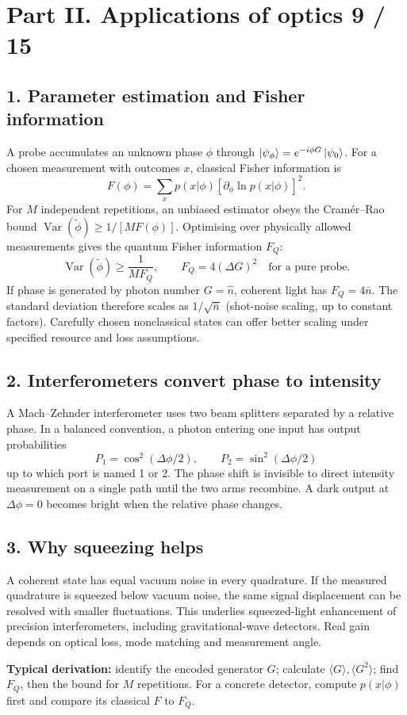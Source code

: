 
\section*{Part II. Applications of optics \hfill 9 / 15}
\subsection*{1. Parameter estimation and Fisher information}
A probe accumulates an unknown phase \(\phi\) through
\(\left\lvert \psi_\phi\right\rangle=e^{-i\phi G}\left\lvert \psi_0\right\rangle\).
For a chosen measurement with outcomes \(x\),
classical Fisher information is
\[
F(\phi)=\sum_xp(x|\phi)
\left[\partial_\phi\ln p(x|\phi)\right]^2.
\]
For \(M\) independent repetitions, an unbiased estimator
obeys the Cram\'er--Rao bound
\(\operatorname{Var}(\tilde\phi)\ge1/[M F(\phi)]\).
Optimising over physically allowed measurements gives
the quantum Fisher information \(F_Q\):
\[
\boxed{\operatorname{Var}(\tilde\phi)
\ge\frac{1}{M F_Q},\qquad
F_Q=4(\Delta G)^2\quad\text{for a pure probe}.}
\]
If phase is generated by photon number \(G=\hat n\), coherent
light has \(F_Q=4\bar n\). The standard deviation therefore
scales as \(1/\sqrt{\bar n}\) (shot-noise scaling, up to
constant factors). Carefully chosen nonclassical states can
offer better scaling under specified resource and loss assumptions.

\subsection*{2. Interferometers convert phase to intensity}
A Mach--Zehnder interferometer uses two beam splitters separated
by a relative phase. In a balanced convention,
a photon entering one input has output probabilities
\[
P_1=\cos^2(\Delta\phi/2),\qquad
P_2=\sin^2(\Delta\phi/2)
\]
up to which port is named 1 or 2. The phase shift is invisible
to direct intensity measurement on a single path until the
two arms recombine. A dark output at \(\Delta\phi=0\)
becomes bright when the relative phase changes.

\subsection*{3. Why squeezing helps}
A coherent state has equal vacuum noise in every
quadrature. If the measured quadrature is squeezed below
vacuum noise, the same signal displacement can be resolved
with smaller fluctuations. This underlies squeezed-light
enhancement of precision interferometers, including
gravitational-wave detectors. Real gain depends on
optical loss, mode matching and measurement angle.

\begin{methodbox}
\textbf{Typical derivation:} identify the encoded generator \(G\);
calculate \(\langle G\rangle,\langle G^2\rangle\);
find \(F_Q\), then the bound for \(M\) repetitions.
For a concrete detector, compute \(p(x|\phi)\) first and compare
its classical \(F\) to \(F_Q\).
\end{methodbox}
